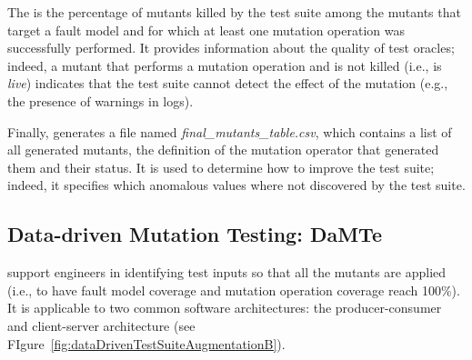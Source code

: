 {The  is the percentage of mutants killed by the test suite  among the mutants that target a fault model and for which at least one mutation operation was successfully performed. It provides information about the quality of test oracles; indeed, a mutant that performs a mutation operation and is not killed (i.e., is \emph{live}) indicates that the test suite cannot detect the effect of the mutation (e.g., the presence of warnings in logs).

Finally, \DAMAT generates a file named \emph{final\_mutants\_table.csv}, which contains a list of all generated mutants, the definition of the mutation operator that generated them and their status. It is used to determine how to improve the test suite; indeed, it specifies which anomalous values where not discovered by the test suite.



\subsection{Data-driven Mutation Testing: DaMTe}



\DAMTE support engineers in identifying test inputs so that all the mutants are applied (i.e., to have fault model coverage and mutation operation coverage reach 100\%). It is applicable to two common software architectures: the producer-consumer and client-server architecture (see FIgure~\ref{fig:dataDrivenTestSuiteAugmentationB}). 


}
